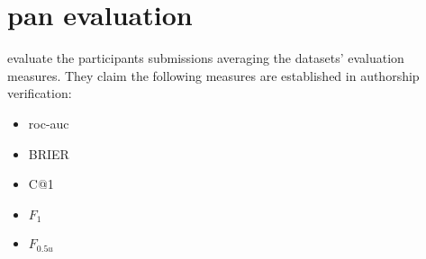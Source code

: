 \section{\acs{pan} evaluation}
\label{sec:pan_evaluation}

\citet{ayele_overview_nodate} evaluate the participants submissions averaging the datasets' evaluation measures.
They claim the following measures are established in authorship verification:
\begin{itemize}
    \item \ac{roc-auc}
    \item BRIER
    \item C@1
    \item $F_1$
    \item $F_{0.5u}$
\end{itemize}